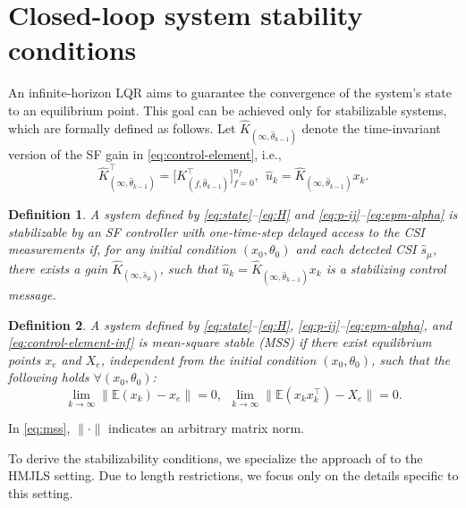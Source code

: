 \documentclass[journal,twoside,web]{ieeecolor}
\newtheorem{definition}{Definition}
\begin{document}
\section{Closed-loop system stability conditions}\label{sec:stability}
An infinite-horizon LQR aims to guarantee the convergence of the system's state to an equilibrium point. This goal can be achieved only for stabilizable systems, which are formally defined as follows. Let $\hat{K}_{(\infty,\hat{\theta}_{k-1})}$ denote the time-invariant version of the SF gain in \eqref{eq:control-element}, i.e.,
\begin{equation}\label{eq:control-element-inf}
	\hat{K}_{(\infty,\hat{\theta}_{k-1})}^{\top} = \big[K_{(f,\hat{\theta}_{k-1})}^{\top}\big]_{f=0}^{n_f},~~
    \hat{u}_{k}=\hat{K}_{(\infty,\hat{\theta}_{k-1})}x_k.
\end{equation}
\begin{definition}\label{def:stabiliz} 
A system defined by \eqref{eq:state}--\eqref{eq:H} and \eqref{eq:p-ij}--\eqref{eq:epm-alpha} is stabilizable by %
an SF controller with one-time-step delayed access to the CSI measurements 
if, for any initial condition $(x_0,\theta_0)$ and each detected CSI $\hat{s}_{\mu}$, there exists a gain $\hat{K}_{(\infty,\hat{s}_{\mu})}$, such that  $\hat{u}_{k}=\hat{K}_{(\infty,\hat{\theta}_{k-1})}x_k$ is a stabilizing control message. %
\end{definition}
\begin{definition}\label{def:mss}
A system defined by \eqref{eq:state}--\eqref{eq:H}, \eqref{eq:p-ij}--\eqref{eq:epm-alpha}, and \eqref{eq:control-element-inf}
is mean-square stable (MSS) if there exist equilibrium points $x_{e}$ and $X_{e}$, independent from the initial condition $(x_0,\theta_0)$, such that the following holds $\forall (x_0,\theta_0)$:
\begin{equation}\label{eq:mss}
        \lim_{k \to \infty} \|\mathbb{E} (x_k)-x_{e} \| = 0,~~
        \lim_{k \to \infty} \|\mathbb{E} (x_k x_k^{\top} )-X_{e}\| = 0.
\end{equation}
\end{definition}
In \eqref{eq:mss}, $\|\cdot\|$ indicates an arbitrary matrix norm.

To derive the stabilizability conditions, we specialize the approach of \cite[Sec. 5]{yZL-2025-automatica} to the HMJLS setting. Due to length restrictions, we focus only on the details specific to this setting.
\end{document}
